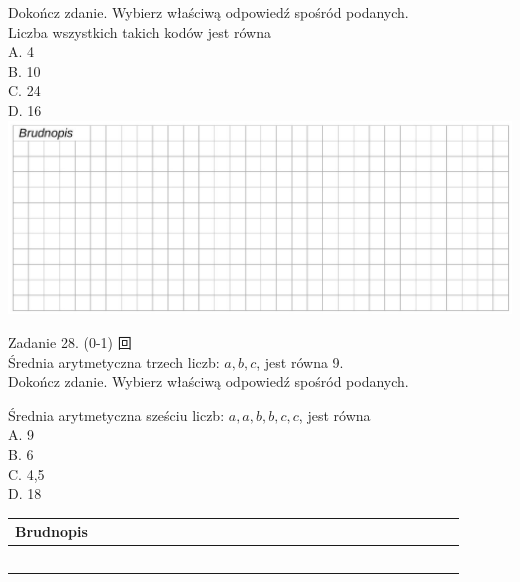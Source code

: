 \documentclass[10pt]{article}
\begin{document}
Dokończ zdanie. Wybierz właściwą odpowiedź spośród podanych.\\
Liczba wszystkich takich kodów jest równa\\
A. 4\\
B. 10\\
C. 24\\
D. 16\\
\includegraphics[max width=\textwidth, center]{2024_11_21_daeb5e5efb43dd4cb535g-24}

Zadanie 28. (0-1) 回\\
Średnia arytmetyczna trzech liczb: \(a, b, c\), jest równa 9.\\
Dokończ zdanie. Wybierz właściwą odpowiedź spośród podanych.

Średnia arytmetyczna sześciu liczb: \(a, a, b, b, c, c\), jest równa\\
A. 9\\
B. 6\\
C. 4,5\\
D. 18

\begin{center}
\begin{tabular}{|c|c|c|c|c|c|c|c|c|c|c|c|c|c|c|c|c|c|c|c|c|c|c|c|c|c|c|c|c|c|c|}
\hline
\multicolumn{5}{|l|}{Brudnopis} &  &  &  &  &  &  &  &  &  &  &  &  &  &  &  &  &  &  &  &  &  &  &  &  &  &  \\
\hline
 &  &  &  &  &  &  &  &  &  &  &  &  &  &  &  &  &  &  &  &  &  &  &  &  &  &  &  &  &  &  \\
\hline
 &  &  &  &  &  &  &  &  &  &  &  &  &  &  &  &  &  &  &  &  &  &  &  &  &  &  &  &  &  &  \\
\hline
 &  &  &  &  &  &  &  &  &  &  &  &  &  &  &  &  &  &  &  &  &  &  &  &  &  &  &  &  &  &  \\
\hline
 &  &  &  &  &  &  &  &  &  &  &  &  &  &  &  &  &  &  &  &  &  &  &  &  &  &  &  &  &  &  \\
\hline
 &  &  &  &  &  &  &  &  &  &  &  &  &  &  &  &  &  &  &  &  &  &  &  &  &  &  &  &  &  &  \\
\hline
\end{tabular}
\end{center}
\end{document}
